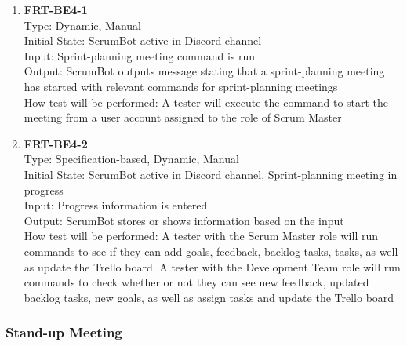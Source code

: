 \documentclass[12pt, titlepage]{article}
\begin{document}
\begin{enumerate}
    \item{\textbf{FRT-BE4-1}}\\
    Type: Dynamic, Manual\\
    Initial State: ScrumBot active in Discord channel\\
    Input: Sprint-planning meeting command is run\\
    Output: ScrumBot outputs message stating that a sprint-planning meeting has started with relevant commands for sprint-planning meetings\\
    How test will be performed: A tester will execute the command to start the meeting from a user account assigned to the role of Scrum Master\\
    
    \item{\textbf{FRT-BE4-2}}\\
    Type: Specification-based, Dynamic, Manual\\
    Initial State: ScrumBot active in Discord channel, Sprint-planning meeting in progress\\
    Input: Progress information is entered\\
    Output: ScrumBot stores or shows information based on the input\\
    How test will be performed: A tester with the Scrum Master role will run commands to see if they can add goals, feedback, backlog tasks, tasks, as well as update the Trello board. A tester with the Development Team role will run commands to check whether or not they can see new feedback, updated backlog tasks, new goals, as well as assign tasks and update the Trello board\\
\end{enumerate}

\subsubsection{Stand-up Meeting}
\end{document}
